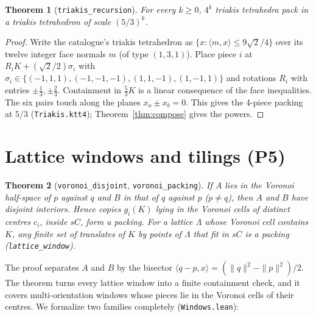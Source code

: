 \documentclass[11pt,a4paper]{article}
\newcommand{\code}[1]{\texttt{\nolinkurl{#1}}}
\newcommand{\lean}[1]{\texttt{#1}}
\newtheorem{theorem}{Theorem}
\theoremstyle{definition}
\theoremstyle{remark}
\begin{document}
\begin{theorem}[\lean{triakis\_recursion}]\label{thm:triakis}
For every $k\ge0$, $4^k$ triakis tetrahedra pack in a triakis tetrahedron of scale $(5/3)^k$.
\end{theorem}

\begin{proof}
Write the catalogue's triakis tetrahedron as $\{x:\langle m,x\rangle\le 9\sqrt2/4\}$ over its twelve integer face normals $m$ (of type $(1,3,1)$). Place piece $i$ at $R_iK+(\sqrt2/2)\sigma_i$ with $\sigma_i\in\{(-1,1,1),(-1,-1,-1),(1,1,-1),(1,-1,1)\}$ and rotations $R_i$ with entries $\pm\frac13,\pm\frac23$. Containment in $\frac53K$ is a linear consequence of the face inequalities. The six pairs touch along the planes $x_a\pm x_b=0$. This gives the 4-piece packing at $5/3$ (\lean{Triakis.ktt4}); Theorem~\ref{thm:compose} gives the powers.
\end{proof}

\section{Lattice windows and tilings (P5)}\label{sec:windows}

\begin{theorem}[\lean{voronoi\_disjoint}, \lean{voronoi\_packing}]
If $A$ lies in the Voronoi half-space of $p$ against $q$ and $B$ in that of $q$ against $p$ ($p\ne q$), then $A$ and $B$ have disjoint interiors. Hence copies $g_i(K)$ lying in the Voronoi cells of distinct centres $c_i$, inside $sC$, form a packing. For a lattice $\Lambda$ whose Voronoi cell contains $K$, any finite set of translates of $K$ by points of $\Lambda$ that fit in $sC$ is a packing (\lean{lattice\_window}).
\end{theorem}

The proof separates $A$ and $B$ by the bisector $\langle q-p,x\rangle=(\|q\|^2-\|p\|^2)/2$. The theorem turns every lattice window into a finite containment check, and it covers multi-orientation windows whose pieces lie in the Voronoi cells of their centres. We formalize two families completely (\code{Windows.lean}):
\end{document}
